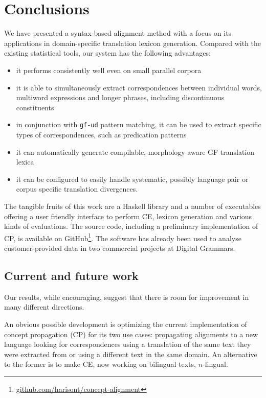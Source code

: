 \documentclass[11pt]{article}
\begin{document}
\section{Conclusions} \label{conclusions}
We have presented a syntax-based alignment method with a focus on its applications in domain-specific translation lexicon generation. Compared with the existing statistical tools, our system has the following advantages:
\begin{itemize} \setlength\itemsep{0.1em}
  \item it performs consistently well even on small parallel corpora
  \item it is able to simultaneously extract correspondences between individual words, multiword expressions and longer phrases, including discontinuous constituents
  \item in conjunction with \texttt{gf-ud} pattern matching, it can be used to extract specific types of correspondences, such as predication patterns  
  \item it can automatically generate compilable, morphology-aware GF translation lexica
  \item it can be configured to easily handle systematic, possibly language pair or corpus specific translation divergences.
\end{itemize}

The tangible fruits of this work are a Haskell library and a number of executables offering a user friendly interface to perform CE, lexicon generation and various kinds of evaluations. 
The source code, including a preliminary implementation of CP, is available on GitHub\footnote{\url{github.com/harisont/concept-alignment}}. 
The software has already been used to analyse customer-provided data in two commercial projects at Digital Grammars. 

\subsection{Current and future work}
Our results, while encouraging, suggest that there is room for improvement in many different directions.

An obvious possible development is optimizing the current implementation of concept propagation (CP) for its two use cases: propagating alignments to a new language looking for correspondences using a translation of the same text they were extracted from or using a different text in the same domain.
An alternative to the former is to make CE, now working on bilingual texts, $n$-lingual.
\end{document}
